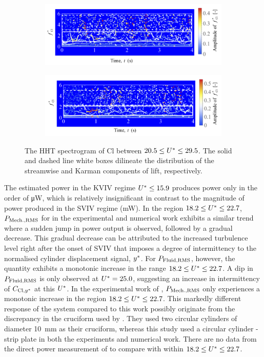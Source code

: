 \documentclass[oneside]{utmthesis}
\begin{document}
\begin{figure} \continuedfloat
  \centering
  \begin{subfigure}[h]{1\textwidth}
    \includegraphics[width=\textwidth]{figs/instantLiftFreq-d}
    \caption{}
    \label{fig:instantLiftFreq-d}
  \end{subfigure}

  \begin{subfigure}[h]{1\textwidth}
    \includegraphics[width=\textwidth]{figs/instantLiftFreq-e}
    \caption{}
    \label{fig:instantLiftFreq-e}
  \end{subfigure}
  \caption{The HHT spectrogram of Cl between $20.5 \leq U^{*} \leq 29.5$. The solid and dashed line white boxes dilineate the distribution of the streamwise and Karman components of lift, respectively.}
  \label{fig:instantLiftFreq}
\end{figure}

The estimated power in the KVIV regime $U^{*} \leq 15.9$ produces power only in the order of \si{\micro\watt}, which is relatively insignificant in contrast to the magnitude of power produced in the SVIV regime (mW). In the region $18.2 \leq U^{*} \leq 22.7$, $P_{\text{Mech.,RMS}}$ for in the experimental and numerical work exhibits a similar trend where a sudden jump in power output is observed, followed by a gradual decrease. This gradual decrease can be attributed to the increased turbulence level right after the onset of SVIV that imposes a degree of intermittency to the normalised cylinder displacement signal, $y^{*}$. For $P_{\text{Fluid,RMS}}$, however, the quantity exhibits a monotonic increase in the range $18.2 \leq U^{*} \leq 22.7$. A dip in $P_{\text{Fluid,RMS}}$ is only observed at $U^{*} = 25.0$, suggesting an increase in intermittency of $C_{\text{Cl},y^{*}}$ at this $U^{*}$. In the experimental work of \citet{Nguyen2012}, $P_{\text{Mech.,RMS}}$ only experiences a monotonic increase in the region $18.2 \leq U^{*} \leq 22.7$. This markedly different response of the system compared to this work possibly originate from the discrepancy in the cruciform used by \citet{Nguyen2012}. They used two circular cylinders of diameter \SI{10}{\milli\metre} as their cruciform, whereas this study used a circular cylinder - strip plate in both the experiments and numerical work. There are no data from the direct power measurement of \citet{Koide2013} to compare with within $18.2 \leq U^{*} \leq 22.7$.
\end{document}
